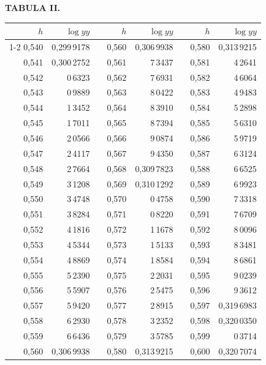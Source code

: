 \endgroup
\clearpage
{}
\begingroup
\centering
\fontsize{9}{9}\selectfont
\setlength{\tabcolsep}{8pt}
\renewcommand{\arraystretch}{1}
\setlength{\parskip}{0pt}
\textbf{TABULA II.}
\par\vspace{7pt}
\begin{tabular}{|r|r|@{}p{9pt}@{}|r|r|@{}p{9pt}@{}|r|r|}
\hline
\(h\) & \(\log yy\) & & \(h\) & \(\log yy\) & & \(h\) & \(\log yy\) \\
\cline{1-2}\cline{4-5}\cline{7-8}
0,540 & 0,299\,9178 &  & 0,560 & 0,306\,9938 &  & 0,580 & 0,313\,9215 \\
0,541 & 0,300\,2752 &  & 0,561 & 7\,3437 &  & 0,581 & 4\,2641 \\
0,542 & 0\,6323 &  & 0,562 & 7\,6931 &  & 0,582 & 4\,6064 \\
0,543 & 0\,9889 &  & 0,563 & 8\,0422 &  & 0,583 & 4\,9483 \\
0,544 & 1\,3452 &  & 0,564 & 8\,3910 &  & 0,584 & 5\,2898 \\
0,545 & 1\,7011 &  & 0,565 & 8\,7394 &  & 0,585 & 5\,6310 \\[3pt]
0,546 & 2\,0566 &  & 0,566 & 9\,0874 &  & 0,586 & 5\,9719 \\
0,547 & 2\,4117 &  & 0,567 & 9\,4350 &  & 0,587 & 6\,3124 \\
0,548 & 2\,7664 &  & 0,568 & 0,309\,7823 &  & 0,588 & 6\,6525 \\
0,549 & 3\,1208 &  & 0,569 & 0,310\,1292 &  & 0,589 & 6\,9923 \\
0,550 & 3\,4748 &  & 0,570 & 0\,4758 &  & 0,590 & 7\,3318 \\[3pt]
0,551 & 3\,8284 &  & 0,571 & 0\,8220 &  & 0,591 & 7\,6709 \\
0,552 & 4\,1816 &  & 0,572 & 1\,1678 &  & 0,592 & 8\,0096 \\
0,553 & 4\,5344 &  & 0,573 & 1\,5133 &  & 0,593 & 8\,3481 \\
0,554 & 4\,8869 &  & 0,574 & 1\,8584 &  & 0,594 & 8\,6861 \\
0,555 & 5\,2390 &  & 0,575 & 2\,2031 &  & 0,595 & 9\,0239 \\[3pt]
0,556 & 5\,5907 &  & 0,576 & 2\,5475 &  & 0,596 & 9\,3612 \\
0,557 & 5\,9420 &  & 0,577 & 2\,8915 &  & 0,597 & 0,319\,6983 \\
0,558 & 6\,2930 &  & 0,578 & 3\,2352 &  & 0,598 & 0,320\,0350 \\
0,559 & 6\,6436 &  & 0,579 & 3\,5785 &  & 0,599 & 0\,3714\rlap{\hspace{.65em}\raisebox{.85ex}{.}} \\
0,560 & 0,306\,9938 &  & 0,580 & 0,313\,9215 &  & 0,600 & 0,320\,7074 \\
\hline
\end{tabular}\par
\endgroup
